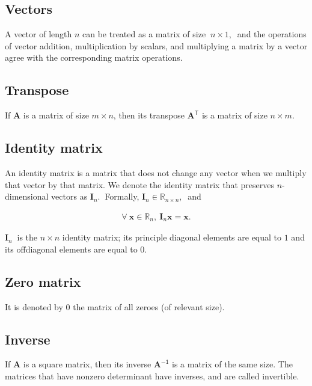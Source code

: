 \documentclass[12pt]{article}
\begin{document}
\subsection{Vectors}

A vector of length $n$ can be treated as a matrix of size $\ n \times 1,\ $ and the operations of vector addition, multiplication by scalars, and multiplying a matrix by a vector agree with the corresponding matrix operations.

\subsection{Transpose}

If $\mathbf{A}$ is a matrix of size $m\times n$, then its transpose $\mathbf{A}^{\mathsf{T}}$ is a matrix of size $n\times m.$

\subsection{Identity matrix}

An identity matrix is a matrix that does not change any vector when we multiply that vector by that matrix. We denote the identity matrix that preserves $n$-dimensional vectors as $\mathbf{I}_{n}.\ $ Formally, $\mathbf{I}_{n}\in\mathbb{R}_{n\times n},\ $ and

\begin{align}
\forall\ \mathbf{x}\in\mathbb{R}_n,\ \mathbf{I}_{n}\mathbf{x} = \mathbf{x}.
\end{align}

$\mathbf{I}_{n}\ $ is the $n\times n$ identity matrix; its principle diagonal elements are equal to $1$ and its offdiagonal elements are equal to $0.$

\subsection{Zero matrix}

It is denoted by $0$ the matrix of all zeroes (of relevant size).

\subsection{Inverse}

If $\mathbf{A}$ is a square matrix, then its inverse $\mathbf{A}^{\mathsf{-1}}$ is a matrix of the same size. The matrices that have nonzero determinant have inverses, and are called invertible.
\end{document}
